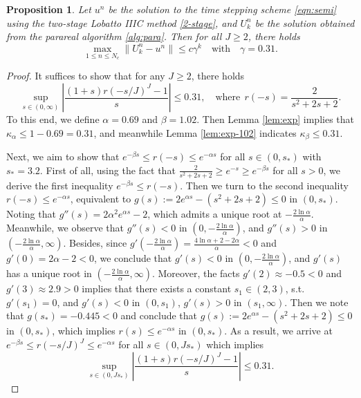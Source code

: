 \documentclass[a4paper, oneside]{book}
\newtheorem{proposition}{Proposition}[section]
\begin{document}
\begin{proposition}\label{prop:lobatto-2}
Let $u^n$ be the solution to the time stepping scheme \eqref{eqn:semi} using
the two-stage Lobatto IIIC method \eqref{2-stage},
and $U_k^n$ be the solution obtained from the parareal algorithm \ref{alg:para}. Then for all $J\ge 2$, there holds
$$ \max_{1 \le n\le N_c} \| U_k^n - u^n \|  \le c \gamma^k\quad \text{with} \quad \gamma=0.31.$$
\end{proposition}

\begin{proof}
It suffices to show that for any $J\ge 2$, there holds
\begin{equation}\label{eqn:lobatto-2}
    \sup_{s\in(0,\infty)}  \left|\frac{(1+s) r(-s/J)^J-1}{s}\right| \le 0.31,
    \quad
    \text{where}~~ r(-s) = \frac{2}{s^2+2s+2}.
\end{equation}
To this end, we define $\alpha = 0.69$ and $\beta=1.02$.
Then Lemma \ref{lem:exp} implies that
$\kappa_\alpha \le 1-0.69 = 0.31$,
and meanwhile Lemma \ref{lem:exp-102} indicates $\kappa_\beta \le 0.31$.

Next, we aim to show that $e^{-\beta s} \le r(-s) \le e^{-\alpha s}$ for all $s\in(0,s_*)$ with $s_*=3.2$. First of all, using the fact that
$\frac{2}{s^2+2s+2} \ge {e^{-s}} \ge e^{-\beta s}$ for all $s > 0$, we derive
the first inequality $e^{-\beta s} \le r(-s)$.
Then we turn to the second inequality
$r(-s) \le e^{-\alpha s}$, equivalent to
$g(s) := 2e^{\alpha s} -(s^2+2s+2) \le 0$ in  $(0, s_*)$.
Noting that $g''(s) = 2\alpha^2 e^{\alpha s} - 2$, which admits a
unique root at $-\frac{2\ln \alpha}{\alpha}$.
Meanwhile, we observe that
$g''(s) <0$ in $(0, -\frac{2\ln \alpha}{\alpha})$,
and $g''(s) >0$ in $( -\frac{2\ln \alpha}{\alpha}, \infty)$.
Besides, since $g'\left( -\frac{2\ln \alpha}{\alpha}\right)  =
\frac{4\ln \alpha +2-2\alpha}{\alpha}<0$
and $g'(0)=2\alpha-2 <0$, we conclude that
$g'(s) < 0$ in $(0, -\frac{2\ln \alpha}{\alpha})$,
and $g'(s)$ has a unique root in $(-\frac{2\ln \alpha}{\alpha}, \infty)$. Moreover, the facts $g'(2) \approx -0.5 <0$ and $g'(3) \approx 2.9 >0$ implies that
there exists a constant $s_1 \in (2,3)$, s.t. $g'(s_1)= 0$,
and $g'(s) <0$ in $(0, s_1)$,
$g'(s) >0$ in $(s_1, \infty)$.
Then we note that $g(s_*) = -0.445 <0$ and conclude that
$g(s) := 2e^{\alpha s} -(s^2+2s+2) \le 0$ in  $(0, s_*)$,
which implies $r(s) \le e^{-\alpha s}$ in $(0, s_*)$.
As a result, we arrive at $e^{-\beta s} \le r(-s/J)^J \le e^{-\alpha s}$
for all $s\in(0, J s_*)$ which  implies
\begin{equation*}
    \sup_{s\in(0, J s_*)}
    \left|\frac{(1+s) r(-s/J)^J-1}{s}\right| \le 0.31.
\end{equation*}


\end{proof}
\end{document}
